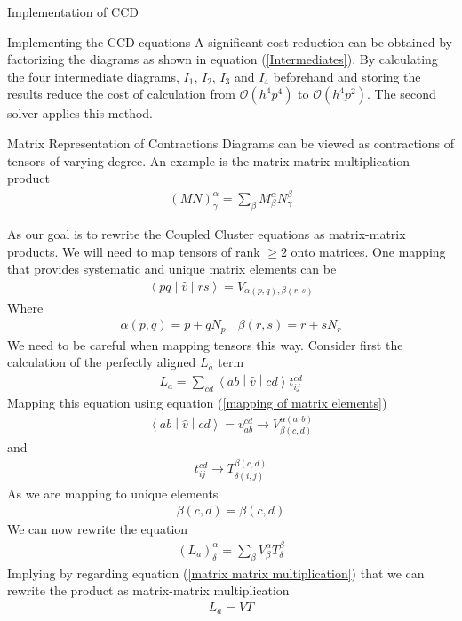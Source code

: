 \documentclass[twoside,english]{uiofysmaster}
\begin{document}
\begin{chapter}{Implementation of CCD}
\begin{section}{Implementing the CCD equations}
		A significant cost reduction can be obtained by factorizing the diagrams as shown in equation (\ref{Intermediates}). By calculating the four intermediate diagrams, $I_1$, $I_2$, $I_3$ and $I_4$ beforehand and storing the results reduce the cost of calculation from $\mathcal{O}(h^4 p^4)$ to $\mathcal{O}(h^4 p^2)$. The second solver applies this method. 

	\end{section}

	\begin{section}{Matrix Representation of Contractions}
		Diagrams can be viewed as contractions of tensors of varying degree. An example is the matrix-matrix multiplication product
		\begin{align}
		 	\left( M N \right)_{\gamma}^{\alpha} = \sum_{\beta} M_{\beta}^\alpha N_\gamma^\beta 
		 	\label{matrix matrix multiplication}
		\end{align} 

		As our goal is to rewrite the Coupled Cluster equations as matrix-matrix products. We will need to map tensors of rank $\geq 2$ onto matrices. One mapping that provides systematic and unique matrix elements can be 
		\begin{align}
			\left<pq\middle| \hat v\middle|rs\right> = V_{\alpha(p,q),\beta(r,s)}
		\end{align}
		Where 
		\begin{align}
			\alpha(p,q) = p + q N_p \;\,\:\; \beta(r,s) = r + s N_r
			\label{mapping of matrix elements}
		\end{align}
		We need to be careful when mapping tensors this way. Consider first the calculation of the perfectly aligned $L_a$ term
		\begin{align}
			L_a = \sum_{cd} \left< ab \middle| \hat v\middle|cd\right> t_{ij}^{cd}
		\end{align}
		Mapping this equation using equation (\ref{mapping of matrix elements})
		\begin{align}
			\left< ab \middle| \hat v\middle|cd\right> = v_{ab}^{cd} \rightarrow V_{\beta(c,d)}^{\alpha(a,b)}
		\end{align}
		and
		\begin{align}
			t_{ij}^{cd} \rightarrow T_{\delta(i,j)}^{\beta(c,d)}
		\end{align}
		As we are mapping to unique elements 
		\begin{align}
			\beta(c,d) = \beta(c,d)
		\end{align}
		We can now rewrite the equation 
		\begin{align}
			(L_a)_ \delta^\alpha = \sum_ \beta V_ \beta^\alpha T_ \delta^\beta
		\end{align}
		Implying by regarding equation (\ref{matrix matrix multiplication}) that we can rewrite the product as matrix-matrix multiplication 
		\begin{align}
			L_a = VT
		\end{align}


\end{section}
\end{chapter}
\end{document}
